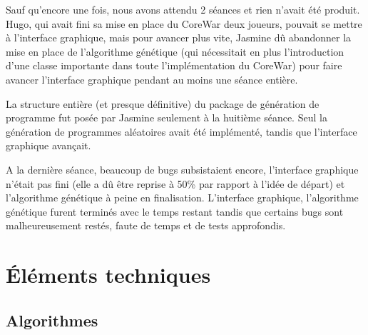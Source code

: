 \documentclass[hidelinks]{report}
\begin{document}
Sauf qu'encore une fois, nous avons attendu 2 séances et rien n'avait été produit. Hugo, qui avait fini sa mise en place du CoreWar deux joueurs, pouvait se mettre à l'interface graphique, mais pour avancer plus vite, Jasmine dû abandonner la mise en place de l'algorithme génétique (qui nécessitait en plus l'introduction d'une classe importante dans toute l'implémentation du CoreWar) pour faire avancer l'interface graphique pendant au moins une séance entière.

La structure entière (et presque définitive) du package de génération de programme fut posée par Jasmine seulement à la huitième séance. Seul la génération de programmes aléatoires avait été implémenté, tandis que l'interface graphique avançait.

A la dernière séance, beaucoup de bugs subsistaient encore, l'interface graphique n'était pas fini (elle a dû être reprise à 50\% par rapport à l'idée de départ) et l'algorithme génétique à peine en finalisation. L'interface graphique, l'algorithme génétique furent terminés avec le temps restant tandis que certains bugs sont malheureusement restés, faute de temps et de tests approfondis. 



\chapter{Éléments techniques}

\section{Algorithmes}
\end{document}
